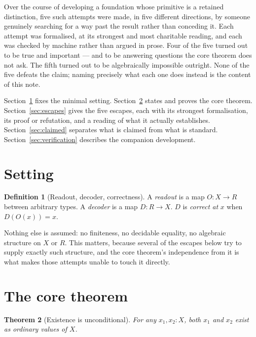 \documentclass[10pt,twocolumn]{article}
\theoremstyle{plain}
\newtheorem{theorem}{Theorem}
\theoremstyle{definition}
\newtheorem{definition}[theorem]{Definition}
\theoremstyle{remark}
\begin{document}
Over the course of developing a foundation whose primitive is a retained distinction, five such attempts were made, in five different directions, by someone genuinely searching for a way past the result rather than conceding it. Each attempt was formalised, at its strongest and most charitable reading, and each was checked by machine rather than argued in prose. Four of the five turned out to be true and important --- and to be answering questions the core theorem does not ask. The fifth turned out to be algebraically impossible outright. None of the five defeats the claim; naming precisely what each one does instead is the content of this note.

Section~\ref{sec:setting} fixes the minimal setting. Section~\ref{sec:core} states and proves the core theorem. Section~\ref{sec:escapes} gives the five escapes, each with its strongest formalisation, its proof or refutation, and a reading of what it actually establishes. Section~\ref{sec:claimed} separates what is claimed from what is standard. Section~\ref{sec:verification} describes the companion development.

\section{Setting}\label{sec:setting}

\begin{definition}[Readout, decoder, correctness]
A \emph{readout} is a map $O : X \to R$ between arbitrary types. A \emph{decoder} is a map $D : R \to X$. $D$ is \emph{correct at} $x$ when $D(O(x)) = x$.
\end{definition}

Nothing else is assumed: no finiteness, no decidable equality, no algebraic structure on $X$ or $R$. This matters, because several of the escapes below try to supply exactly such structure, and the core theorem's independence from it is what makes those attempts unable to touch it directly.

\section{The core theorem}\label{sec:core}

\begin{theorem}[Existence is unconditional]\label{thm:exist}
For any $x_1, x_2 : X$, both $x_1$ and $x_2$ exist as ordinary values of $X$.
\end{theorem}
\end{document}
